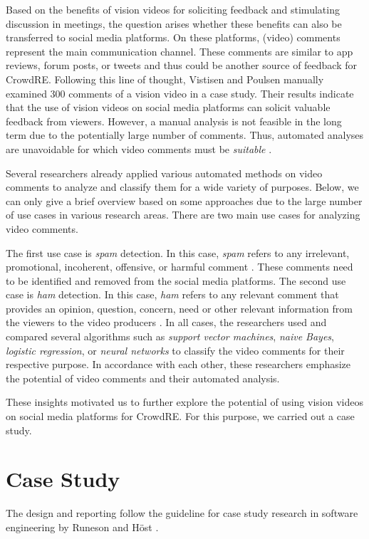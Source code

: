 \documentclass[conference]{IEEEtran}
\begin{document}
Based on the benefits of vision videos for soliciting feedback and stimulating discussion in meetings, the question arises whether these benefits can also be transferred to social media platforms. On these platforms, (video) comments represent the main communication channel. These comments are similar to app reviews, forum posts, or tweets and thus could be another source of feedback for CrowdRE. Following this line of thought, Vistisen and Poulsen \cite{Vistisen.2017} manually examined 300 comments of a vision video in a case study. Their results indicate that the use of vision videos on social media platforms can solicit valuable feedback from viewers. However, a manual analysis is not feasible in the long term due to the potentially large number of comments. Thus, automated analyses are unavoidable for which video comments must be \textit{suitable} \cite{Groen.2018, Groen.2015}.

Several researchers already applied various automated methods on video comments to analyze and classify them for a wide variety of purposes. Below, we can only give a brief overview based on some approaches due to the large number of use cases in various research areas. There are two main use cases for analyzing video comments.

The first use case is \textit{spam} detection. In this case, \textit{spam} refers to any irrelevant, promotional, incoherent, offensive, or harmful comment \cite{Sharmin.2017, Abdullah.2018, Obadimu.2019, Das.2020}. These comments need to be identified and removed from the social media platforms. 
The second use case is \textit{ham} detection. In this case, \textit{ham} refers to any relevant comment that provides an opinion, question, concern, need or other relevant information from the viewers to the video producers \cite{Asghar.2015, Khan.2016, Poche.2017, Benkhelifa.2018}.
In all cases, the researchers used and compared several algorithms such as \textit{support vector machines}, \textit{naive Bayes}, \textit{logistic regression}, or \textit{neural networks} to classify the video comments for their respective purpose. In accordance with each other, these researchers emphasize the potential of video comments and their automated analysis.

These insights motivated us to further explore the potential of using vision videos on social media platforms for CrowdRE. For this purpose, we carried out a case study.

\section{Case Study}
\label{sec:case-study}
The design and reporting follow the guideline for case study research in software engineering by Runeson and Höst \cite{Runeson.2009}.
\end{document}
